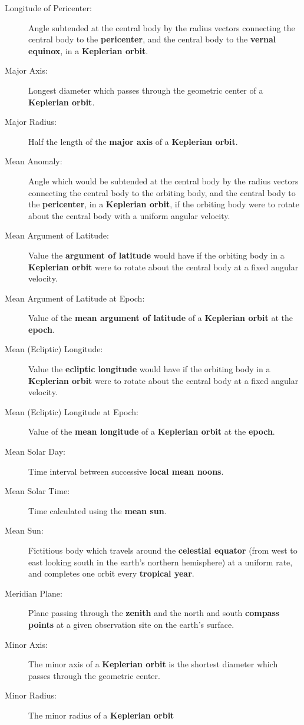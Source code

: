 {\begin{description}
\item [Longitude of Pericenter:] Angle subtended at the central
body by the
radius vectors connecting the central body to the {\bf pericenter}, and the central body to the {\bf vernal equinox}, in a {\bf Keplerian orbit}.
\item [Major Axis:] Longest diameter which passes through the geometric center of a {\bf Keplerian orbit}.
\item [Major Radius:] Half the length of the {\bf major axis}\/ of a {\bf Keplerian orbit}.
\item [Mean Anomaly:] Angle which would be subtended at the central
body by the radius
vectors connecting the central body to the orbiting body, and the central
body to the
{\bf pericenter}, in a {\bf Keplerian orbit}, if the orbiting body were to rotate about the central body
with a uniform angular velocity.
\item [Mean Argument of Latitude:] Value the
{\bf argument of latitude}\/ would have if the orbiting body in a
{\bf Keplerian orbit}\/ were to rotate about the central body at a fixed angular velocity.
\item [Mean Argument of Latitude at Epoch:]  Value of the {\bf mean argument of latitude}\/ of a {\bf Keplerian orbit}\/
at the {\bf epoch}.
\item[Mean (Ecliptic) Longitude:]  Value the {\bf ecliptic longitude}\/ would
have if the orbiting body in a {\bf Keplerian orbit}\/ were to rotate about the central body at a fixed angular velocity.
\item [Mean (Ecliptic) Longitude at Epoch:] Value of the {\bf mean longitude}\/ of a {\bf Keplerian orbit}\/
at the {\bf epoch}.
\item[Mean Solar Day:] Time interval between successive {\bf local mean noons}.
\item[Mean Solar Time:] Time calculated using the {\bf mean sun}.
\item [Mean Sun:] Fictitious body which travels around the
{\bf celestial equator}\/ (from west to east looking south in the
earth's northern hemisphere) at a uniform rate, and completes one
orbit every {\bf tropical year}. 
\item[Meridian Plane:] Plane passing through the {\bf zenith}\/ and the north and
south {\bf compass points}\/ at a given observation site on the earth's surface.
\item[Minor Axis:] The minor axis of a {\bf Keplerian orbit}\/ is the
shortest diameter which passes through the geometric center.
\item [Minor Radius:] The minor radius of a {\bf Keplerian orbit}\/ 

\end{description}}
